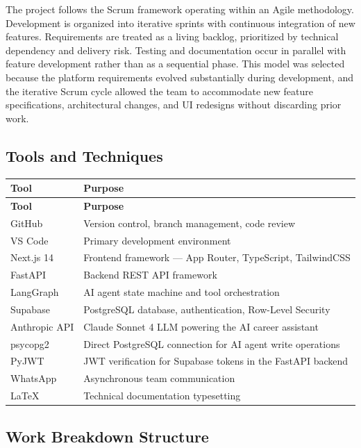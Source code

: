 \documentclass[12pt,a4paper]{article}
\begin{document}
The project follows the Scrum framework operating within an Agile methodology.
Development is organized into iterative sprints with continuous integration of
new features. Requirements are treated as a living backlog, prioritized by
technical dependency and delivery risk. Testing and documentation occur in
parallel with feature development rather than as a sequential phase. This model
was selected because the platform requirements evolved substantially during
development, and the iterative Scrum cycle allowed the team to accommodate new
feature specifications, architectural changes, and UI redesigns without
discarding prior work.

\subsection{Tools and Techniques}

\begin{longtable}{@{} L{3.5cm} L{11cm} @{}}
\toprule
\textbf{Tool} & \textbf{Purpose} \\
\midrule
\endfirsthead
\toprule
\textbf{Tool} & \textbf{Purpose} \\
\midrule
\endhead
\bottomrule
\endlastfoot
GitHub          & Version control, branch management, code review \\[2pt]
VS Code         & Primary development environment \\[2pt]
Next.js 14      & Frontend framework --- App Router, TypeScript, TailwindCSS \\[2pt]
FastAPI         & Backend REST API framework \\[2pt]
LangGraph       & AI agent state machine and tool orchestration \\[2pt]
Supabase        & PostgreSQL database, authentication, Row-Level Security \\[2pt]
Anthropic API   & Claude Sonnet 4 LLM powering the AI career assistant \\[2pt]
psycopg2        & Direct PostgreSQL connection for AI agent write operations \\[2pt]
PyJWT           & JWT verification for Supabase tokens in the FastAPI backend \\[2pt]
WhatsApp        & Asynchronous team communication \\[2pt]
LaTeX           & Technical documentation typesetting \\
\end{longtable}

\subsection{Work Breakdown Structure}
\end{document}
